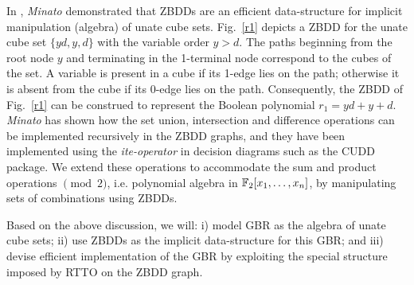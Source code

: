 In \cite{zbdd_unate}, {\it Minato} demonstrated that ZBDDs are an
efficient data-structure for implicit manipulation (algebra) of unate
cube sets. Fig.~\ref{r1} depicts a ZBDD for the unate cube set
$\{yd,y,d\}$ with the variable order  $y > d$. The paths beginning
from the root node $y$ and terminating in the 1-terminal node
correspond to the cubes of the set. A variable is present in a cube if
its 1-edge lies on the path; otherwise it is absent from the cube
if its 0-edge lies on the path. 
Consequently, the ZBDD of Fig.~\ref{r1} can be construed to
represent the Boolean polynomial $r_1 = yd + y +d$. {\it Minato} has
shown \cite{zbdd}\cite{zbdd_unate} how the set union, intersection and
difference operations can be implemented recursively in the ZBDD
graphs, and they have been implemented using the {\it ite-operator} in
decision diagrams such as the CUDD \cite{cudd} package. We extend
these operations to accommodate the sum and product operations
$\pmod{2}$, i.e. polynomial algebra in ${\mathbb{F}}_{2}[x_1,\dots,x_n]$, by 
manipulating sets of combinations using ZBDDs. 



Based on the above discussion, we will: i) model GBR as the
algebra of unate cube sets; ii) use ZBDDs as the implicit
data-structure for this GBR; and iii) devise efficient implementation
of the GBR by exploiting the special structure imposed by RTTO on the
ZBDD graph.  


